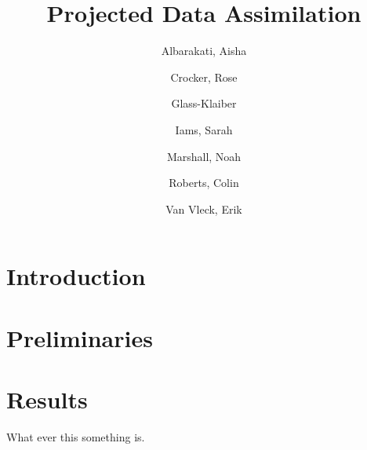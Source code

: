 \documentclass[12pt]{article}
\title{Projected Data Assimilation}
\author{
	Albarakati, Aisha \and
	Crocker, Rose \and
	Glass-Klaiber \and
	Iams, Sarah \and
	Marshall, Noah \and
	Roberts, Colin \and
	Van Vleck, Erik
}
\begin{document}
\maketitle

\section{Introduction}


\section{Preliminaries}


\section{Results}


\newpage
\begin{thebibliography}{1}
	
	 What ever this something is.
	
\end{thebibliography}
\end{document}
